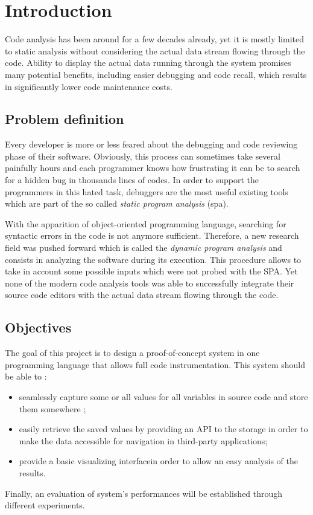 
\chapter{Introduction} %
\label{chap:introduction}
Code analysis has been around for a few decades already, yet it is mostly limited to static analysis without considering the actual data stream flowing through the code. Ability to display the actual data running through the system promises many potential benefits, including easier debugging and code recall, which results in significantly lower code maintenance costs. 

\section{Problem definition}
Every developer is more or less feared about the debugging and code reviewing phase of their software. Obviously, this process can sometimes take several painfully hours and each programmer knows how frustrating it can be to search for a hidden bug in thousands lines of codes. In order to support the programmers in this hated task, debuggers are the most useful existing tools which are part of the so called \textit{static program analysis} (\gls{spa}). 

With the apparition of object-oriented programming language, searching for syntactic errors in the code is not anymore sufficient. Therefore, a new research field was pushed forward which is called the \textit{dynamic program analysis} and consists in analyzing the software during its execution. This procedure allows to take in account some possible inputs which were not probed with the SPA. Yet none of the modern code analysis tools was able to successfully integrate their source code editors with the actual data stream flowing through the code.

\section{Objectives}
The goal of this project is to design a proof-of-concept system in one programming language that allows full code instrumentation. This system should be able to :
\begin{itemize}
   \item seamlessly capture some or all values for all variables in source code and store them somewhere ;
   \item easily retrieve the saved values by providing an API to the storage in order to make the data accessible for navigation in third-party applications;
   \item provide a basic visualizing interfacein order to allow an easy analysis of the results.  
 \end{itemize}  
 Finally, an evaluation of system's performances will be established through different experiments.

